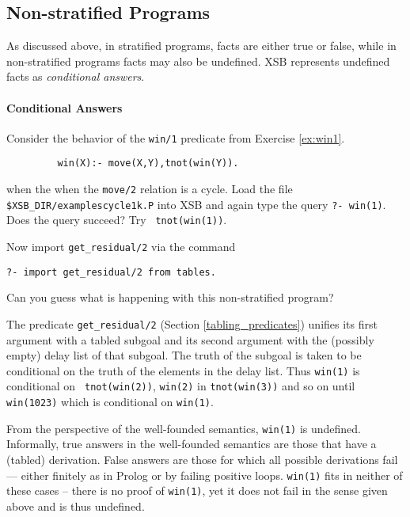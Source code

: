 \subsection{Non-stratified Programs}

As discussed above, in stratified programs, facts are either true or
false, while in non-stratified programs facts may also be undefined.
XSB represents undefined facts as {\em conditional answers}.

\paragraph*{Conditional Answers}

\begin{exercise}
Consider the behavior of the {\tt win/1} predicate from Exercise
\ref{ex:win1}.
\begin{verbatim}
         win(X):- move(X,Y),tnot(win(Y)).
\end{verbatim}
when the when the {\tt move/2} relation is a cycle.  Load the file
{\tt \verb|$XSB_DIR/examples|cycle1k.P} into XSB and again type the
query {\tt ?- win(1)}.  Does the query succeed?  Try {\tt
tnot(win(1))}.

Now import {\tt get\_residual/2} via the command
\begin{verbatim}
?- import get_residual/2 from tables.
\end{verbatim}
Can you guess what is happening with this non-stratified program?
\end{exercise}

The predicate {\tt get\_residual/2} (Section \ref{tabling_predicates})
unifies its first argument with a tabled subgoal and its second
argument with the (possibly empty) delay list of that subgoal.  The
truth of the subgoal is taken to be conditional on the truth of the
elements in the delay list.  Thus {\tt win(1)} is conditional on {\tt
tnot(win(2))}, {\tt win(2)} in {\tt tnot(win(3))} and so on until {\tt
win(1023)} which is conditional on {\tt win(1)}.

From the perspective of the well-founded semantics, {\tt win(1)} is
undefined.  Informally, true answers in the well-founded semantics are
those that have a (tabled) derivation.  False answers are those for
which all possible derivations fail --- either finitely as in Prolog
or by failing positive loops.  {\tt win(1)} fits in neither of these
cases -- there is no proof of {\tt win(1)}, yet it does not fail in
the sense given above and is thus undefined.

